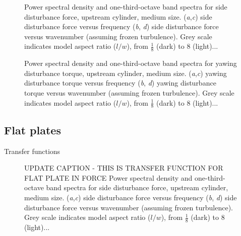 \begin{figure} 
\caption{Power spectral density and one-third-octave band spectra for side disturbance force, upstream cylinder, medium size. (\textit{a},\textit{c}) side disturbance force versus frequency (\textit{b}, \textit{d}) side disturbance force versus wavenumber (assuming frozen turbulence).  Grey scale indicates model aspect ratio ($l/w$), from $\frac{1}{8}$ (dark) to \num{8} (light)...}
\label{fig:exampleforcespectra}
\end{figure}

\begin{figure} 
\caption{Power spectral density and one-third-octave band spectra for yawing disturbance torque, upstream cylinder, medium size. (\textit{a},\textit{c}) yawing disturbance torque versus frequency (\textit{b}, \textit{d}) yawing disturbance torque versus wavenumber (assuming frozen turbulence).  Grey scale indicates model aspect ratio ($l/w$), from $\frac{1}{8}$ (dark) to \num{8} (light)...}
\label{fig:exampleforcespectra}
\end{figure}



\subsection{Flat plates}
Transfer functions

\begin{figure} 
\caption{UPDATE CAPTION - THIS IS TRANSFER FUNCTION FOR FLAT PLATE IN FORCE Power spectral density and one-third-octave band spectra for side disturbance force, upstream cylinder, medium size. (\textit{a},\textit{c}) side disturbance force versus frequency (\textit{b}, \textit{d}) side disturbance force versus wavenumber (assuming frozen turbulence).  Grey scale indicates model aspect ratio ($l/w$), from $\frac{1}{8}$ (dark) to \num{8} (light)...}
\end{figure}

